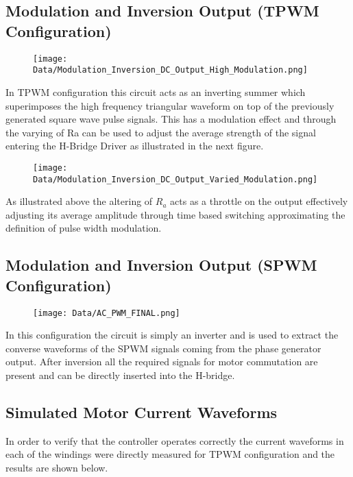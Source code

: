 \documentclass[12pt]{article}
\begin{document}
\begin{appendices}
\subsection{Modulation and Inversion Output (TPWM Configuration)}%
\begin{figure}[H]
\centering
\texttt{[image: Data/Modulation\_Inversion\_DC\_Output\_High\_Modulation.png]}
\label{Triangle_Gen_Output}
\end{figure}

In TPWM configuration this circuit acts as an inverting summer which superimposes the high frequency triangular waveform on top of the previously generated square wave pulse signals. This has a modulation effect and through the varying of Ra can be used to adjust the average strength of the signal entering the H-Bridge Driver as illustrated in the next figure.

\begin{figure}[H]
\centering
\texttt{[image: Data/Modulation\_Inversion\_DC\_Output\_Varied\_Modulation.png]}
\label{Triangle_Gen_Output}
\end{figure}

As illustrated above the altering of $R_a$ acts as a throttle on the output effectively adjusting its average amplitude through time based switching approximating the definition of pulse width modulation.

\subsection{Modulation and Inversion Output (SPWM Configuration)}%

\begin{figure}[H]
\centering
\texttt{[image: Data/AC\_PWM\_FINAL.png]}
\label{Triangle_Gen_Output}
\end{figure}


In this configuration the circuit is simply an inverter and is used to extract the converse waveforms of the SPWM signals coming from the phase generator output. After inversion all the required signals for motor commutation are present and can be directly inserted into the H-bridge.

\subsection{Simulated Motor Current Waveforms}%

In order to verify that the controller operates correctly the current waveforms in each of the windings were directly measured for TPWM configuration and the results are shown below.


\end{appendices}
\end{document}
